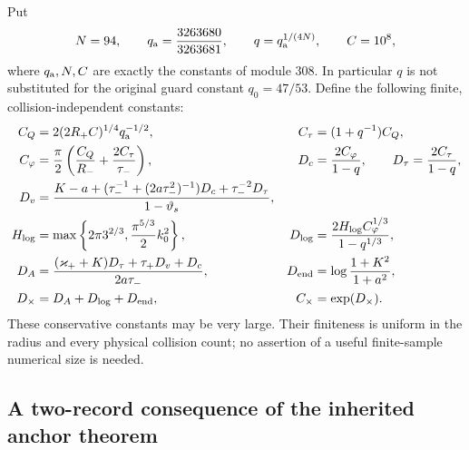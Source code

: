 Put
\begin{equation}\label{eq:xd-constants-first}
 N=94,\qquad q_{\rm a}={3263680\over3263681},\qquad
 q=q_{\rm a}^{1/(4N)},\qquad C=10^8,
\end{equation}
where $q_{\rm a},N,C$ are exactly the constants of module 308.
In particular $q$ is not substituted for the original guard constant
$q_0=47/53$.  Define the following finite, collision-independent
constants:
\begin{align}
 C_Q&=2(2R_+C)^{1/4}q_{\rm a}^{-1/2},
 &C_\tau&=(1+q^{-1})C_Q,\label{eq:xd-CQ}\\
 C_\varphi&={\pi\over2}
       \left({C_Q\over R_-}+{2C_\tau\over\tau_-}\right),
 &D_c&={2C_\varphi\over1-q},\qquad
 D_\tau={2C_\tau\over1-q},\label{eq:xd-Cphi}\\
 D_v&={K-a+
       (\tau_-^{-1}+(2a\tau_-^2)^{-1})D_c
                    +\tau_-^{-2}D_\tau\over1-\vartheta_s},
 \label{eq:xd-Dv}\\
 H_{\log}&=\max\left\{2\pi3^{2/3},
                         {\pi^{5/3}\over2}k_0^2\right\},
 &D_{\log}&={2H_{\log}C_\varphi^{1/3}\over1-q^{1/3}},
 \label{eq:xd-Dlog}\\
 D_A&={ (\varkappa_++K)D_\tau+\tau_+D_v+D_c
                                                 \over2a\tau_-},
 &D_{\rm end}&=\log{1+K^2\over1+a^2},\label{eq:xd-DA}\\
 D_\times&=D_A+D_{\log}+D_{\rm end},
 &C_\times&=\exp(D_\times).
 \label{eq:xd-final-constant}
\end{align}
These conservative constants may be very large.  Their finiteness is
uniform in the radius and every physical collision count; no assertion
of a useful finite-sample numerical size is needed.

\subsection{A two-record consequence of the inherited anchor theorem}

